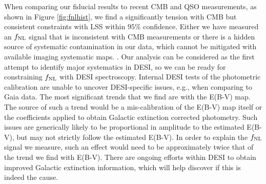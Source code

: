 When comparing our fiducial results to recent CMB and QSO measurements, as shown in Figure \ref{fig:fnlhist}, we find a significantly tension with CMB but consistent constraints with LSS within $95\%$ confidence. Either we have measured an $f_{\rm NL}$ signal that is inconsistent with CMB measurements or there is a hidden source of systematic contamination in our data, which cannot be mitigated with available imaging systematic maps. . Our analysis can be considered as the first attempt to identify major systematics in DESI, so we can be ready for constraining $f_{\rm NL}$ with DESI spectroscopy. Internal DESI tests of the photometric calibration are unable to uncover DESI-specific issues, e.g., when comparing to Gaia data. The most significant trends that we find are with the E(B-V) map. The source of such a trend would be a mis-calibration of the E(B-V) map itself or the coefficients applied to obtain Galactic extinction corrected photometry. Such issues are generically likely to be proportional in amplitude to the estimated E(B-V), but may not strictly follow the estimated E(B-V). In order to explain the $f_{\rm NL}$ signal we measure, such an effect would need to be approximately twice that of the trend we find with E(B-V). There are ongoing efforts within DESI to obtain improved Galactic extinction information, which will help discover if this is indeed the cause.





